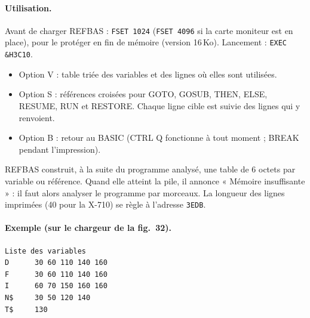 \documentclass[a4paper,10pt]{article}
\newcommand{\hex}[1]{\texttt{#1}}
\begin{document}
\paragraph{Utilisation.} Avant de charger REFBAS : \texttt{FSET 1024}
(\texttt{FSET 4096} si la carte moniteur est en place), pour le protéger en
fin de mémoire (version 16\,Ko). Lancement : \texttt{EXEC \&H3C10}.
\begin{itemize}
  \item Option V : table triée des variables et des lignes où elles sont
        utilisées.
  \item Option S : références croisées pour GOTO, GOSUB, THEN, ELSE,
        RESUME, RUN et RESTORE. Chaque ligne cible est suivie des lignes qui
        y renvoient.
  \item Option B : retour au BASIC (CTRL Q fonctionne à tout moment ; BREAK
        pendant l'impression).
\end{itemize}
REFBAS construit, à la suite du programme analysé, une table de 6 octets par
variable ou référence. Quand elle atteint la pile, il annonce « Mémoire
insuffisante » : il faut alors analyser le programme par morceaux. La longueur
des lignes imprimées (40 pour la X-710) se règle à l'adresse \hex{3EDB}.

\paragraph{Exemple (sur le chargeur de la fig.~32).}
\begin{verbatim}
Liste des variables
D      30 60 110 140 160
F      30 60 110 140 160
I      60 70 150 160 160
N$     30 50 120 140
T$     130
\end{verbatim}
\end{document}
